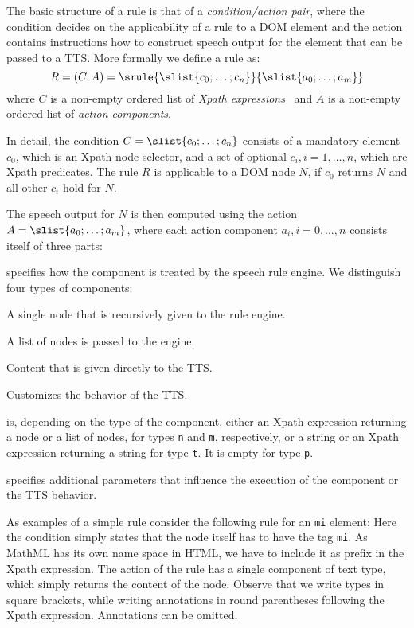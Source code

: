\documentclass{sig-alternate}
\begin{document}
The basic structure of a rule is that of a \emph{condition/action pair}, where
the condition decides on the applicability of a rule to a DOM element and the
action contains instructions how to construct speech output for the element
that can be passed to a TTS. More formally we define a rule as:
\[R= ({C},{A}) = \srule{\slist{c_0;\ldots;c_n}}{\slist{a_0;\ldots;a_m}} \] where
$C$ is a non-empty ordered list of \emph{Xpath expressions}~\cite{clark1999xpl} and
$A$ is a non-empty ordered list of \emph{action components}.

In detail, the condition $C=\slist{c_0;\ldots;c_n}$ consists of a mandatory
element $c_0$, which is an Xpath node selector, and a set of optional $c_i,
i=1,\ldots,n$, which are Xpath predicates. The rule $R$ is applicable to a DOM
node $N$, if $c_0$ returns $N$ and all other $c_i$ hold for $N$.

The speech output for $N$ is then computed using the action $A =
\slist{a_0;\ldots;a_m}$, where each action component $a_i, i=0,\ldots,n$
consists itself of three parts: 
\begin{description}\itemsep-1.5pt
\item[Type] specifies how the component is treated by the speech rule engine. We
  distinguish four types of components:
  \begin{description}\itemsep-1.5pt
  \item[Node (denoted \textmd{\texttt{n}})] A single node that is recursively given to
    the rule engine.
  \item[Multi (\textmd{\texttt{m}})] A list of nodes is passed to the engine.
  \item[Text (\textmd{\texttt{t}})] Content that is given directly to the TTS.
  \item[Personality (\textmd{\texttt{p}})] Customizes the behavior of the TTS.
  \end{description}
\item[Content] is, depending on the type of the component, either an Xpath
  expression returning a node or a list of nodes, for types \texttt{n} and
  \texttt{m}, respectively, or a string or an Xpath expression returning a
  string for type \texttt{t}.  It is empty for type \texttt{p}.
\item[Annotation] specifies additional parameters that influence the execution
  of the component or the TTS behavior.
\end{description}

As examples of a simple rule consider the following rule for an \texttt{mi}
element:  Here the condition simply states
that the node itself has to have the tag \texttt{mi}. As MathML has its own name
space in HTML, we have to include it as prefix in the Xpath expression. The
action of the rule has a single component of text type, which simply returns the
content of the node. Observe that we write types in square brackets, while
writing annotations in round parentheses following the Xpath
expression. Annotations can be omitted.
\end{document}
